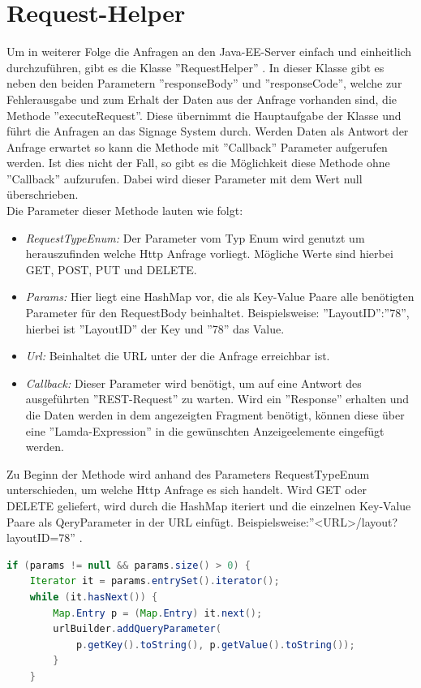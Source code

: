 \section{Request-Helper}
Um in weiterer Folge die Anfragen an den Java-EE-Server einfach und einheitlich durchzuführen, gibt es die Klasse ''RequestHelper'' . In dieser Klasse gibt es neben den beiden Parametern ''responseBody'' und ''responseCode'', welche zur Fehlerausgabe und zum Erhalt der Daten aus der Anfrage vorhanden sind, die Methode ''executeRequest''. Diese übernimmt die Hauptaufgabe der Klasse und führt die Anfragen an das Signage System durch. Werden Daten als Antwort der Anfrage erwartet so kann die Methode mit ''Callback'' Parameter aufgerufen werden. Ist dies nicht der Fall, so gibt es die Möglichkeit diese Methode ohne ''Callback'' aufzurufen. Dabei wird dieser Parameter mit dem Wert null überschrieben.
\\
Die Parameter dieser Methode lauten wie folgt:
\\
\begin{itemize}
	\item {\em RequestTypeEnum:} Der Parameter vom Typ Enum wird genutzt um herauszufinden welche Http Anfrage vorliegt. Mögliche Werte sind hierbei GET, POST, PUT und DELETE.
	
	\item {\em Params:} Hier liegt eine HashMap vor, die als Key-Value Paare alle benötigten Parameter für den RequestBody beinhaltet. Beispielsweise: ''LayoutID'':''78'', hierbei ist ''LayoutID'' der Key und ''78'' das Value.
		
	\item {\em Url:} Beinhaltet die URL unter der die Anfrage erreichbar ist. 
	
	\item {\em Callback:} Dieser Parameter wird benötigt, um auf eine Antwort des ausgeführten ''REST-Request'' zu warten. Wird ein ''Response'' erhalten und die Daten werden in dem angezeigten Fragment benötigt, können diese über eine ''Lamda-Expression'' in die gewünschten Anzeigeelemente eingefügt werden. 
\end{itemize}
Zu Beginn der Methode wird anhand des Parameters RequestTypeEnum unterschieden, um welche Http Anfrage es sich handelt. Wird GET oder DELETE geliefert, wird durch die HashMap iteriert und die einzelnen Key-Value Paare als QeryParameter in der URL einfügt.
Beispielsweise:''<URL>/layout?layoutID=78'' .
\begin{lstlisting}[language=Java,caption={GET oder DELETE Request}]
if (params != null && params.size() > 0) {
    Iterator it = params.entrySet().iterator();
    while (it.hasNext()) {
     	Map.Entry p = (Map.Entry) it.next();
	    urlBuilder.addQueryParameter(
	      	p.getKey().toString(), p.getValue().toString());
        }
    }
\end{lstlisting}
